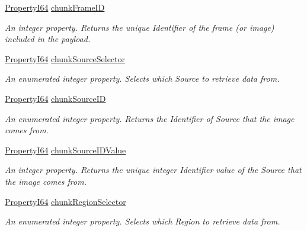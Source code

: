 \begin{DoxyCompactItemize}
\hyperlink{group___common_interface_ga81749b2696755513663492664a18a893}{Property\+I64} \hyperlink{classmv_i_m_p_a_c_t_1_1acquire_1_1_gen_i_cam_1_1_chunk_data_control_a5d3849e86e7ae821d2a3ca73d6b472fc}{chunk\+Frame\+I\+D}
\begin{DoxyCompactList}\small\item\em An integer property. Returns the unique Identifier of the frame (or image) included in the payload. \end{DoxyCompactList}\item 
\hyperlink{group___common_interface_ga81749b2696755513663492664a18a893}{Property\+I64} \hyperlink{classmv_i_m_p_a_c_t_1_1acquire_1_1_gen_i_cam_1_1_chunk_data_control_acab8906c60d43214bdbc540dafa7a62e}{chunk\+Source\+Selector}
\begin{DoxyCompactList}\small\item\em An enumerated integer property. Selects which Source to retrieve data from. \end{DoxyCompactList}\item 
\hyperlink{group___common_interface_ga81749b2696755513663492664a18a893}{Property\+I64} \hyperlink{classmv_i_m_p_a_c_t_1_1acquire_1_1_gen_i_cam_1_1_chunk_data_control_a014b54e61bfa874ae1b64cf7de60a4cf}{chunk\+Source\+I\+D}
\begin{DoxyCompactList}\small\item\em An enumerated integer property. Returns the Identifier of Source that the image comes from. \end{DoxyCompactList}\item 
\hyperlink{group___common_interface_ga81749b2696755513663492664a18a893}{Property\+I64} \hyperlink{classmv_i_m_p_a_c_t_1_1acquire_1_1_gen_i_cam_1_1_chunk_data_control_adc24abab055024927db1829bdbd17b74}{chunk\+Source\+I\+D\+Value}
\begin{DoxyCompactList}\small\item\em An integer property. Returns the unique integer Identifier value of the Source that the image comes from. \end{DoxyCompactList}\item 
\hyperlink{group___common_interface_ga81749b2696755513663492664a18a893}{Property\+I64} \hyperlink{classmv_i_m_p_a_c_t_1_1acquire_1_1_gen_i_cam_1_1_chunk_data_control_a44981b8369742dda80bf40a15190c93a}{chunk\+Region\+Selector}
\begin{DoxyCompactList}\small\item\em An enumerated integer property. Selects which Region to retrieve data from. \end{DoxyCompactList}\item 

\end{DoxyCompactItemize}
